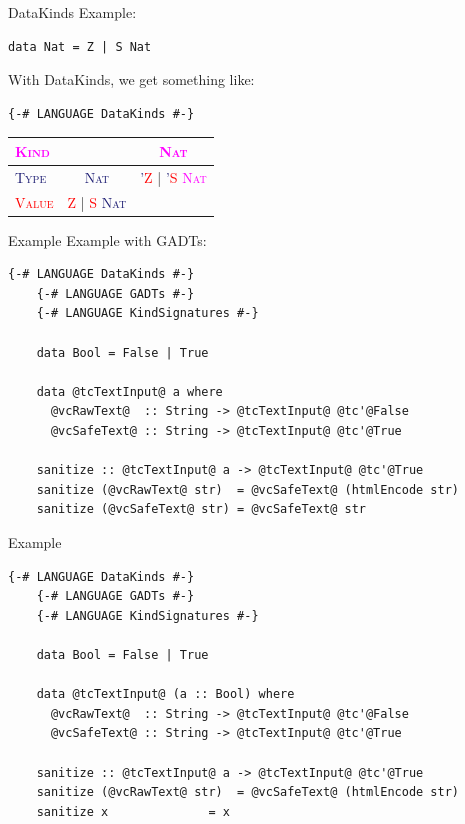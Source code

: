 \documentclass[xcolor={usenames,dvipsnames}]{beamer}
\newcommand{\htycon}[1]{\textcolor{MidnightBlue}{\textsc{#1}}}
\newcommand{\hvalcon}[1]{\textcolor{Red}{\textsc{#1}}}
\newcommand{\hkind}[1]{\textcolor{Fuchsia}{\textsc{#1}}}
\begin{document}
\begin{frame}[fragile]{DataKinds}
  Example:
  \begin{lstlisting}[style=hask]
    data Nat = Z | S Nat
  \end{lstlisting}

  With DataKinds, we get something like:
  \begin{lstlisting}[style=hask]
    {-# LANGUAGE DataKinds #-}
  \end{lstlisting}
  \begin{tabular}{l || c | c}
    \hkind{Kind} & \ & \hkind{Nat} \\
    \hline \htycon{Type} & \htycon{Nat} & \htycon{'}\hvalcon{Z} | \htycon{'}\hvalcon{S} \hkind{Nat} \\
    \hline \hvalcon{Value} & \hvalcon{Z} | \hvalcon{S} \htycon{Nat} & \ \\
  \end{tabular}
\end{frame}

\begin{frame}[fragile]{Example}
  Example with GADTs:
  \begin{lstlisting}[style=hask]
    {-# LANGUAGE DataKinds #-}
    {-# LANGUAGE GADTs #-}
    {-# LANGUAGE KindSignatures #-}

    data Bool = False | True

    data @tcTextInput@ a where
      @vcRawText@  :: String -> @tcTextInput@ @tc'@False
      @vcSafeText@ :: String -> @tcTextInput@ @tc'@True

    sanitize :: @tcTextInput@ a -> @tcTextInput@ @tc'@True
    sanitize (@vcRawText@ str)  = @vcSafeText@ (htmlEncode str)
    sanitize (@vcSafeText@ str) = @vcSafeText@ str
  \end{lstlisting}
\end{frame}

\begin{frame}[fragile]{Example}
  \begin{lstlisting}[style=hask]
    {-# LANGUAGE DataKinds #-}
    {-# LANGUAGE GADTs #-}
    {-# LANGUAGE KindSignatures #-}

    data Bool = False | True

    data @tcTextInput@ (a :: Bool) where
      @vcRawText@  :: String -> @tcTextInput@ @tc'@False
      @vcSafeText@ :: String -> @tcTextInput@ @tc'@True

    sanitize :: @tcTextInput@ a -> @tcTextInput@ @tc'@True
    sanitize (@vcRawText@ str)  = @vcSafeText@ (htmlEncode str)
    sanitize x              = x
  \end{lstlisting}
\end{frame}
\end{document}
